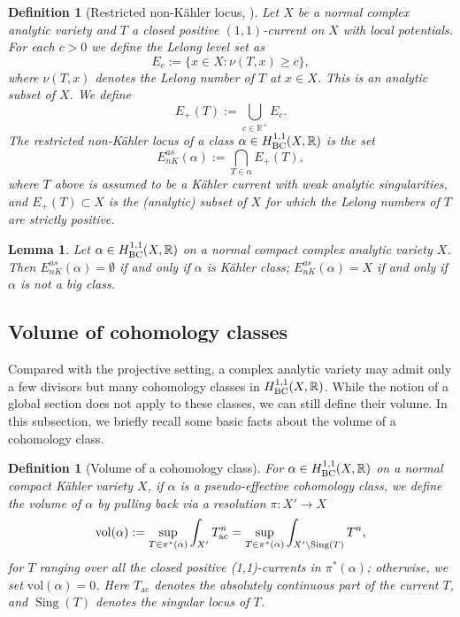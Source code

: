 \documentclass[12pt]{amsart}
\numberwithin{equation}{section}
\newtheorem{lemma}  [theorem]     {Lemma}
\theoremstyle{definition}
\theoremstyle{plain}
\newtheorem{definition}  [theorem]     {Definition}
\newtheorem*{thm A*}{Theorem A}
\newtheorem*{thm B*}{Theorem B}
\newtheorem*{thm C*}{Theorem C}
\newtheorem*{thm D*}{Theorem D}
\theoremstyle{definition}
\renewcommand{\1}{\mathds{1}}
\renewcommand{\>}{\rightarrow}
\newcommand{\R}{\mathbb R}
\begin{document}
\begin{definition}[{Restricted non-K\"ahler locus, \cite[Definition 4.18]{HP24}}]
Let $X$ be a normal complex analytic variety and $T$ a closed positive $(1,1)$-current on $X$ with local potentials. For each $c>0$ we define the \emph{Lelong level set} as 
$$
E_c:=\{x \in X: \nu(T, x)\ge c\},
$$
where $\nu(T, x)$ denotes the Lelong number of $T$ at $x \in X$.
This is an analytic subset of $X$. We define
$$
E_{+}(T):=\bigcup_{c \in \mathbb{R}^{+}} E_c .
$$
The \emph{restricted non-K\"ahler locus} of a class $\alpha\in H^{1,1}_{\rm{BC}}(X,\R)$ is the set
$$
E_{n K}^{a s}(\alpha):=\bigcap_{T \in \alpha} E_{+}(T),
$$
where $T$ above is assumed to be a K\"ahler current with weak analytic singularities, and $E_{+}(T) \subset X$ is the (analytic) subset of $X$ for which the Lelong numbers of $T$ are strictly positive. 
\end{definition}

\begin{lemma}\label{nonKahlerlocus}
Let $\alpha \in H^{1,1}_{\rm{BC}}(X,\mathbb{R})$ on a normal compact complex analytic variety $X$. Then $E_{nK}^{as}(\alpha) = \emptyset $ if and only if $\alpha$ is K\"ahler class; $E_{nK}^{as}(\alpha) = X$ if and only if $\alpha$ is not a big class.
\end{lemma}




\subsection{Volume of cohomology classes}
Compared with the projective setting, a complex analytic variety may admit only a few divisors but many cohomology classes in $H_{\rm{BC}}^{1,1}(X,\mathbb{R})$. While the notion of a global section does not apply to these classes, we can still define their volume. In this subsection, we briefly recall some basic facts about the volume of a cohomology class. 

\begin{definition}[Volume of a cohomology class]\label{Def:Vol}
For $\alpha \in H^{1,1}_{\rm{BC}}(X, \mathbb{R})$ on a normal compact K\"ahler variety $X$, if $\alpha$ is a pseudo-effective cohomology class, we define the \emph{volume} of $\alpha$ by pulling back via a resolution $\pi: X'\to X$ 
$$
\mathrm{vol}  (\alpha):=\sup _{T\in \pi^*(\alpha)} \int_{X'} T_{\rm{ac}}^n =  \sup _{T\in \pi^*(\alpha) }\int_{X' \setminus \operatorname{Sing}(T)}T^n,
$$
for $T$ ranging over all the closed positive (1,1)-currents in $\pi^*(\alpha)$; otherwise, we set $\mathrm{vol}(\alpha)=0$. Here $T_{\mathrm{ac}}$ denotes the absolutely continuous part of the current $T$, and $\operatorname{Sing}(T)$ denotes the singular locus of $T$.
\end{definition}
\end{document}
